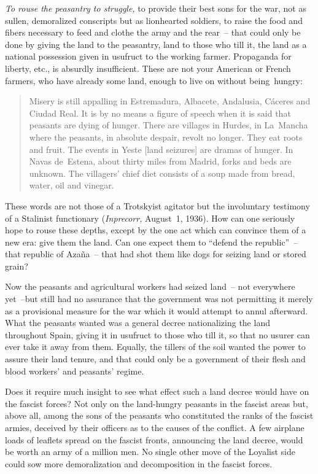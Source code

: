 \emph{To rouse the peasantry to struggle,} to provide their best sons for the war, not as sullen, demoralized conscripts but as lionhearted soldiers, to raise the food and fibers necessary to feed and clothe the army and the rear~-- that could only be done by giving the land to the peasantry, land to those who till it, the land as a national possession given in usufruct to the working farmer. Propaganda for liberty, etc., is absurdly insufficient. These are not your American or French farmers, who have already some land, enough to live on without being~hungry:

\begin{quotation}
  Misery is still appalling in Estremadura, Albacete, Andalusia, C\'aceres and Ciudad Real. It is by no means a figure of speech when it is said that peasants are dying of hunger. There are villages in Hurdes, in La~Mancha where the peasants, in absolute despair, revolt no longer. They eat roots and fruit. The events in Yeste [land seizures] are dramas of hunger. In Navas de~Estena, about thirty miles from Madrid, forks and beds are unknown. The villagers’ chief diet consists of a soup made from bread, water, oil and vinegar.
\end{quotation}

These words are not those of a Trotskyist agitator but the involuntary testimony of a Stalinist functionary (\emph{Inprecorr,} August~1, 1936). How can one seriously hope to rouse these depths, except by the one act which can convince them of a new era: give them the land. Can one expect them to ``defend the republic''~-- that republic of Azaña~-- that had shot them like dogs for seizing land or stored grain?

Now the peasants and agricultural workers had seized land~-- not everywhere yet~--but still had no assurance that the government was not permitting it merely as a provisional measure for the war which it would attempt to annul afterward. What the peasants wanted was a general decree nationalizing the land throughout Spain, giving it in usufruct to those who till it, so that no usurer can ever take it away from them. Equally, the tillers of the soil wanted the power to assure their land tenure, and that could only be a government of their flesh and blood workers’ and peasants’ regime.

Does it require much insight to see what effect such a land decree would have on the fascist forces? Not only on the land-hungry peasants in the fascist areas but, above all, among the sons of the peasants who constituted the ranks of the fascist armies, deceived by their officers as to the causes of the conflict. A few airplane loads of leaflets spread on the fascist fronts, announcing the land decree, would be worth an army of a million men. No single other move of the Loyalist side could sow more demoralization and decomposition in the fascist forces.

